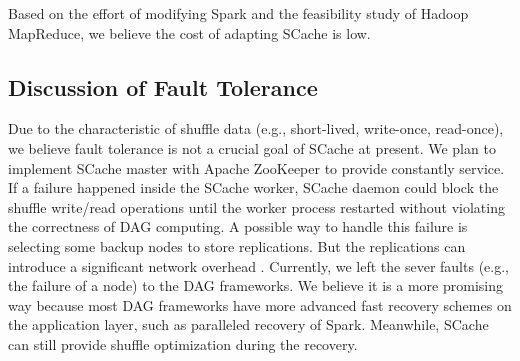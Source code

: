 Based on the effort of modifying Spark and the feasibility study of Hadoop MapReduce, we believe the cost of adapting SCache is low.

\subsection{Discussion of Fault Tolerance}

\ifrevision
\reversemarginpar
{}
\fi
Due to the characteristic of shuffle data (e.g., short-lived, write-once, read-once), we believe fault tolerance is not a crucial goal of SCache at present. 
We plan to implement SCache master with Apache ZooKeeper \cite{zookeeper} to provide constantly service. 
If a failure happened inside the SCache worker, SCache daemon could block the shuffle write/read operations until the worker process restarted without violating the correctness of DAG computing.
A possible way to handle this failure is selecting some backup nodes to store replications. 
But the replications can introduce a significant network overhead \cite{availability}.  
Currently, we left the sever faults (e.g., the failure of a node) to the DAG frameworks. 
We believe it is a more promising way because most DAG frameworks have more advanced fast recovery schemes on the application layer, such as paralleled recovery of Spark. 
Meanwhile, SCache can still provide shuffle optimization during the recovery.


